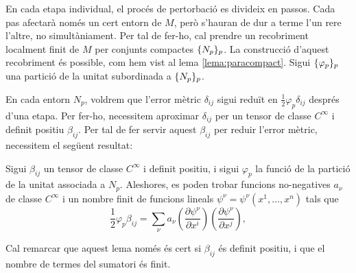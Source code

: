 En cada etapa individual, el procés de pertorbació es divideix en passos. Cada pas afectarà només un cert entorn de $M$, però s'hauran de dur a terme l'un rere l'altre, no simultàniament. Per tal de fer-ho, cal prendre un recobriment localment finit de $M$ per conjunts compactes $\{N_p\}_p$. La construcció d'aquest recobriment és possible, com hem vist al lema \ref{lema:paracompact}. Sigui $\{\varphi_p\}_p$ una partició de la unitat subordinada a $\{N_p\}_p$. 

En cada entorn $N_p$, voldrem que l'error mètric $\delta_{ij}$ sigui reduït en $\frac12\varphi_p\delta_{ij}$ després d'una etapa. Per fer-ho, necessitem aproximar $\delta_{ij}$ per un tensor de classe $C^\infty$ i definit positiu $\beta_{ij}$. Per tal de fer servir aquest $\beta_{ij}$ per reduir l'error mètric, necessitem el següent resultat:
\begin{lema}
    Sigui $\beta_{ij}$ un tensor de classe $C^\infty$ i definit positiu, i sigui $\varphi_p$ la funció de la partició de la unitat associada a $N_p$. Aleshores, es poden trobar funcions no-negatives $a_\nu$ de classe $C^\infty$ i un nombre finit de funcions lineals $\psi^\nu = \psi^\nu(x^1, \dots, x^n)$ tals que
\begin{equation}\label{eq:lema_descomp}
    \frac12\varphi_p\beta_{ij} = \sum_\nu a_\nu \left(\frac{\partial\psi^\nu}{\partial x^i}\right)\left(\frac{\partial\psi^\nu}{\partial x^j}\right),
\end{equation}
\end{lema}
\begin{obs}
    Cal remarcar que aquest lema només és cert si $\beta_{ij}$ és definit positiu, i que el nombre de termes del sumatori és finit.
\end{obs}
